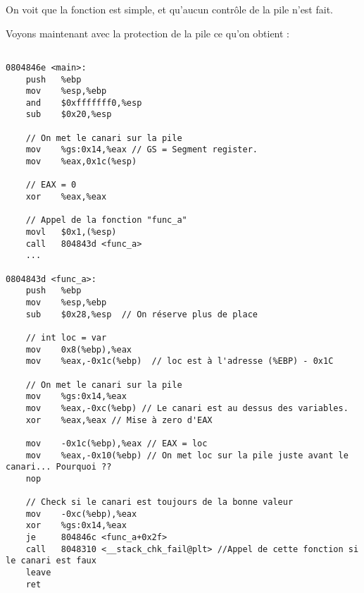 On voit que la fonction est simple, et qu'aucun contrôle de la pile n'est fait. 

\pagebreak Voyons maintenant avec la protection de la pile ce qu'on obtient :
\begin{lstlisting}[frame=single,style=C]  % Start your code-block

0804846e <main>:
	push   %ebp
	mov    %esp,%ebp
	and    $0xfffffff0,%esp
	sub    $0x20,%esp
	
	// On met le canari sur la pile
	mov    %gs:0x14,%eax // GS = Segment register.
	mov    %eax,0x1c(%esp) 
	
	// EAX = 0
	xor    %eax,%eax
	
	// Appel de la fonction "func_a"
	movl   $0x1,(%esp)
	call   804843d <func_a>
	...
	
0804843d <func_a>:
	push   %ebp
	mov    %esp,%ebp
	sub    $0x28,%esp  // On réserve plus de place
	
	// int loc = var
	mov    0x8(%ebp),%eax
	mov    %eax,-0x1c(%ebp)  // loc est à l'adresse (%EBP) - 0x1C 
	
	// On met le canari sur la pile
	mov    %gs:0x14,%eax  
	mov    %eax,-0xc(%ebp) // Le canari est au dessus des variables. 
	xor    %eax,%eax // Mise à zero d'EAX
	
	mov    -0x1c(%ebp),%eax // EAX = loc 
	mov    %eax,-0x10(%ebp) // On met loc sur la pile juste avant le canari... Pourquoi ??
	nop
	
	// Check si le canari est toujours de la bonne valeur
	mov    -0xc(%ebp),%eax
	xor    %gs:0x14,%eax
	je     804846c <func_a+0x2f>
	call   8048310 <__stack_chk_fail@plt> //Appel de cette fonction si le canari est faux
	leave  
	ret   
\end{lstlisting}